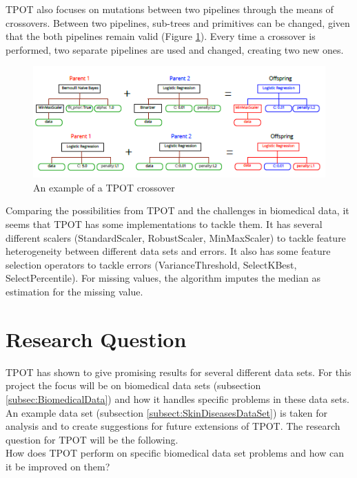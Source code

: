 \documentclass[10pt,a4paper]{article}
\begin{document}
	TPOT also focuses on mutations between two pipelines through the means of crossovers. Between two pipelines, sub-trees and primitives can be changed, given that the both pipelines remain valid (Figure \ref{fig:TPOTCrossover}). Every time a crossover is performed, two separate pipelines are used and changed, creating two new ones.
	
	\begin{figure}[h!]
		\includegraphics[scale=1]{TPOTCrossover.png}
		\caption{An example of a TPOT crossover\cite{Gijsbers2017Thesis}}
		\label{fig:TPOTCrossover}
	\end{figure}
	
	Comparing the possibilities from TPOT and the challenges in biomedical data, it seems that TPOT has some implementations to tackle them. It has several different scalers (StandardScaler, RobustScaler, MinMaxScaler) to tackle feature heterogeneity between different data sets and errors. It also has some feature selection operators to tackle errors (VarianceThreshold, SelectKBest, SelectPercentile). For missing values, the algorithm imputes the median as estimation for the missing value.
	
	\section{Research Question}
	\label{sec:ResearchQuestion}
	
	TPOT has shown to give promising results for several different data sets.\cite{Gijsbers2017Thesis} For this project the focus will be on biomedical data sets (subsection \ref{subsec:BiomedicalData}) and how it handles specific problems in these data sets. An example data set (subsection \ref{subsect:SkinDiseasesDataSet}) is taken for analysis and to create suggestions for future extensions of TPOT. The research question for TPOT will be the following.\\
	
	How does TPOT perform on specific biomedical data set problems and how can it be improved on them?\\
	
\end{document}
